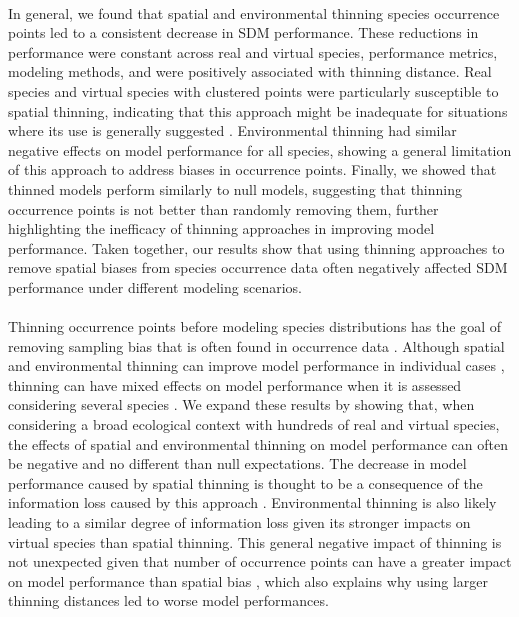 \paragraph*{}
In general, we found that spatial and environmental thinning species occurrence points led to a consistent decrease in SDM performance. These reductions in performance were constant across real and virtual species, performance metrics, modeling methods, and were positively associated with thinning distance. Real species and virtual species with clustered points were particularly susceptible to spatial thinning, indicating that this approach might be inadequate for situations where its use is generally suggested \parencite{beck2014, boria2014}. Environmental thinning had similar negative effects on model performance for all species, showing a general limitation of this approach to address biases in occurrence points. Finally, we showed that thinned models perform similarly to null models, suggesting that thinning occurrence points is not better than randomly removing them, further highlighting the inefficacy of thinning approaches in improving model performance. Taken together, our results show that using thinning approaches to remove spatial biases from species occurrence data often negatively affected SDM performance under different modeling scenarios.


\paragraph*{}
Thinning occurrence points before modeling species distributions has the goal of removing sampling bias that is often found in occurrence data \parencite{varela2014, aiello2015}. Although spatial and environmental thinning can improve model performance in individual cases \parencite{boria2014, varela2014}, thinning can have mixed effects on model performance when it is assessed considering several species \parencite{steen2021,inman2021, baker2022}. We expand these results by showing that, when considering a broad ecological context with hundreds of real and virtual species, the effects of spatial and environmental thinning on model performance can often be negative and no different than null expectations. The decrease in model performance caused by spatial thinning is thought to be a consequence of the information loss caused by this approach \parencite{varela2014}. Environmental thinning is also likely leading to a similar degree of information loss given its stronger impacts on virtual species than spatial thinning. This general negative impact of thinning is not unexpected given that number of occurrence points can have a greater impact on model performance than spatial bias \parencite{gaul2020}, which also explains why using larger thinning distances led to worse model performances.






